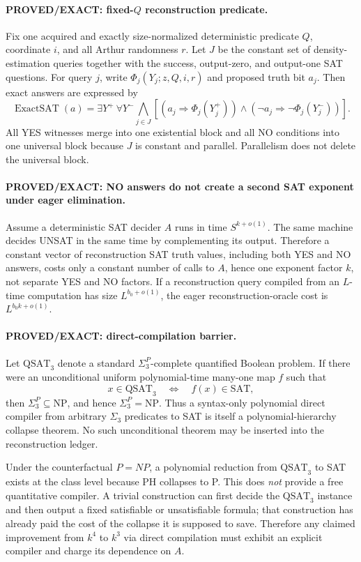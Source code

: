 \documentclass[11pt]{article}
\begin{document}
\paragraph{PROVED/EXACT: fixed-$Q$ reconstruction predicate.}
Fix one acquired and exactly size-normalized deterministic predicate $Q$, coordinate $i$, and all Arthur randomness $r$. Let $J$ be the constant set of density-estimation queries together with the success, output-zero, and output-one SAT questions. For query $j$, write $\Phi_j(Y_j;z,Q,i,r)$ and proposed truth bit $a_j$. Then exact answers are expressed by
\[
\operatorname{ExactSAT}(a)=\exists Y^+\ \forall Y^-\!
\bigwedge_{j\in J}\left[(a_j\Rightarrow\Phi_j(Y_j^+))\wedge(\neg a_j\Rightarrow\neg\Phi_j(Y_j^-))\right].
\]
All YES witnesses merge into one existential block and all NO conditions into one universal block because $J$ is constant and parallel. Parallelism does not delete the universal block.

\paragraph{PROVED/EXACT: NO answers do not create a second SAT exponent under eager elimination.}
Assume a deterministic SAT decider $A$ runs in time $S^{k+o(1)}$. The same machine decides UNSAT in the same time by complementing its output. Therefore a constant vector of reconstruction SAT truth values, including both YES and NO answers, costs only a constant number of calls to $A$, hence one exponent factor $k$, not separate YES and NO factors. If a reconstruction query compiled from an $L$-time computation has size $L^{b_0+o(1)}$, the eager reconstruction-oracle cost is $L^{b_0k+o(1)}$.

\paragraph{PROVED/EXACT: direct-compilation barrier.}
Let $\mathrm{QSAT}_3$ denote a standard $\Sigma_3^P$-complete quantified Boolean problem. If there were an unconditional uniform polynomial-time many-one map $f$ such that
\[
x\in\mathrm{QSAT}_3\quad\Longleftrightarrow\quad f(x)\in\mathrm{SAT},
\]
then $\Sigma_3^P\subseteq\mathrm{NP}$, and hence $\Sigma_3^P=\mathrm{NP}$. Thus a syntax-only polynomial direct compiler from arbitrary $\Sigma_3$ predicates to SAT is itself a polynomial-hierarchy collapse theorem. No such unconditional theorem may be inserted into the reconstruction ledger.

Under the counterfactual $P=NP$, a polynomial reduction from $\mathrm{QSAT}_3$ to SAT exists at the class level because PH collapses to P. This does \emph{not} provide a free quantitative compiler. A trivial construction can first decide the $\mathrm{QSAT}_3$ instance and then output a fixed satisfiable or unsatisfiable formula; that construction has already paid the cost of the collapse it is supposed to save. Therefore any claimed improvement from $k^4$ to $k^3$ via direct compilation must exhibit an explicit compiler and charge its dependence on $A$.
\end{document}
